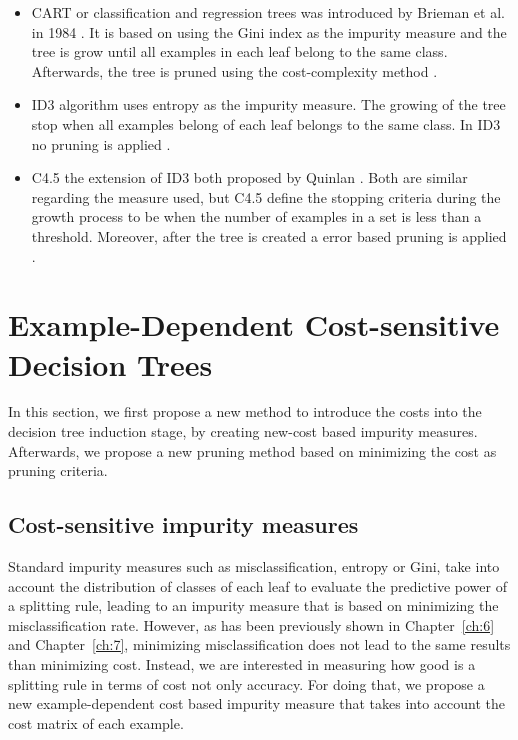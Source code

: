 \begin{itemize}
 \item 
  CART or classification and regression trees was introduced by Brieman et al. in 1984 
\citep{Breiman1984a}. It is based on using the Gini index as the impurity measure and the tree is 
grow until all examples in  each leaf belong to the same class. Afterwards, the tree is pruned 
using 
the cost-complexity  method \citep{Rokach2010,Marslan2009}.
  
\item ID3
  algorithm uses entropy as the impurity measure. The growing of the tree stop when all 
examples belong  of each leaf belongs to the same class. In ID3 no pruning is applied 
\citep{Quinlan1992}.
  
\item C4.5
  the extension of ID3 both proposed by Quinlan \citep{Quinlan1992}.  Both are similar 
regarding the measure used, but C4.5 define the stopping criteria during the growth process
  to be when the number of examples in a set is less than a threshold. Moreover, after the tree is 
created  a error based pruning is applied \citep{Rokach2010}.
\end{itemize} 


\section{Example-Dependent Cost-sensitive Decision Trees}
\label{sec:8:csdt}
     
  In this section, we first propose a new method to introduce the costs into the decision tree 
	induction stage, by creating new-cost based impurity measures. Afterwards, we propose a new 
	pruning method based on minimizing the cost as pruning criteria.

	\subsection{Cost-sensitive impurity measures}

		Standard impurity measures such as misclassification, entropy or Gini, take into account the 
		distribution of classes of each leaf to evaluate the predictive power of a splitting rule,
		leading to an impurity measure that is based on minimizing the misclassification rate. However, 
		as has been previously shown in Chapter~\ref{ch:6} and Chapter~\ref{ch:7}, minimizing 
  misclassification does not lead to the same results than minimizing cost. Instead, we are 
  interested in measuring how good is a splitting rule in terms of cost not only accuracy. For 
  doing that, we propose a new example-dependent cost based impurity measure that takes into 
  account the cost matrix of each example.

